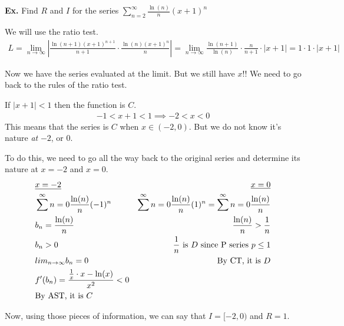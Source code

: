 \documentclass[12pt,letterpaper]{article} \usepackage{amsmath} \usepackage{graphicx}  \usepackage{longtable}  \usepackage{amssymb}
\begin{document}
    \begin{mdframed}
        \textbf{Ex.} Find $R$ and $I$ for the series $\sum^{\infty}_{n=2} \frac{\ln(n)}{n} (x+1)^n$

        We will use the ratio test. 
        \begin{align*}
            L = \lim_{n\to\infty} \left|\frac{\ln(n+1)(x+1)^{n+1}}{n+1}\cdot \frac{\ln(n)(x+1)^n}{n}\right| = \lim_{n\to\infty} \frac{\ln(n+1)}{\ln(n)}\cdot\frac{n}{n+1}\cdot|x+1|=1\cdot1\cdot|x+1|
        \end{align*}

        Now we have the series evaluated at the limit. But we still have $x$!! We need to go back to the rules of the ratio test. 

        If $|x+1|<1$ then the function is $C$.
        \begin{align*}
            -1<x+1<1 \implies -2<x<0
        \end{align*}
        This means that the series is $C$ when $x \in (-2,0)$. But we do not know it's nature \emph{at} $-2$, or $0$.

        To do this, we need to go all the way back to the original series and determine its nature at $x=-2$ and $x=0$.
        \begin{align*}
            &\textbf{\underline{$x=-2$}} &\textbf{\underline{$x=0$}}\\
            &\sum^{\infty}{n=0} \frac{\ln(n)}{n}(-1)^n &\sum^{\infty}{n=0} \frac{\ln(n)}{n}(1)^n= \sum^{\infty}{n=0} \frac{\ln(n)}{n}\\
            & b_n = \frac{\ln(n)}{n} &\frac{\ln(n)}{n} > \frac{1}{n} \\
            & b_n > 0 &\frac{1}{n}\text{ is $D$ since P series } p\le 1\\
            & lim_{n\to\infty} b_n = 0 & \text{By CT, it is $D$}\\
            & f'(b_n) = \frac{\frac{1}{x}\cdot x - \ln(x)}{x^2}<0\\
            & \text{By AST, it is $C$}
        \end{align*}

        Now, using those pieces of information, we can say that $I=[-2,0)$ and $R=1$.
    \end{mdframed}
\end{document}
